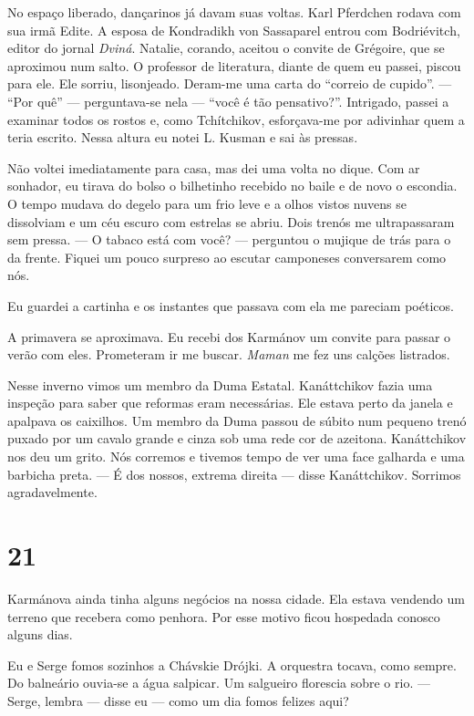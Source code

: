 No espaço liberado, dançarinos já davam suas voltas. Karl Pferdchen
rodava com sua irmã Edite. A esposa de Kondradikh von Sassaparel entrou
com Bodriévitch, editor do jornal \emph{Dviná}. Natalie, corando,
aceitou o convite de Grégoire, que se aproximou num salto. O professor
de literatura, diante de quem eu passei, piscou para ele. Ele sorriu,
lisonjeado. Deram-me uma carta do ``correio de cupido''. --- ``Por quê''
--- perguntava-se nela --- ``você é tão pensativo?''. Intrigado, passei
a examinar todos os rostos e, como Tchítchikov, esforçava-me por
adivinhar quem a teria escrito. Nessa altura eu notei L. Kusman e sai às
pressas.

Não voltei imediatamente para casa, mas dei uma volta no dique. Com ar
sonhador, eu tirava do bolso o bilhetinho recebido no baile e de novo o
escondia. O tempo mudava do degelo para um frio leve e a olhos vistos
nuvens se dissolviam e um céu escuro com estrelas se abriu. Dois trenós
me ultrapassaram sem pressa. --- O tabaco está com você? --- perguntou o
mujique de trás para o da frente. Fiquei um pouco surpreso ao escutar
camponeses conversarem como nós.

Eu guardei a cartinha e os instantes que passava com ela me pareciam
poéticos.

A primavera se aproximava. Eu recebi dos Karmánov um convite para passar
o verão com eles. Prometeram ir me buscar. \emph{Maman} me fez uns
calções listrados.

Nesse inverno vimos um membro da Duma Estatal. Kanáttchikov fazia uma
inspeção para saber que reformas eram necessárias. Ele estava perto da
janela e apalpava os caixilhos. Um membro da Duma passou de súbito num
pequeno trenó puxado por um cavalo grande e cinza sob uma rede cor de
azeitona. Kanáttchikov nos deu um grito. Nós corremos e tivemos tempo de
ver uma face galharda e uma barbicha preta. --- É dos nossos, extrema
direita --- disse Kanáttchikov. Sorrimos agradavelmente.

\section{21}

Karmánova ainda tinha alguns negócios na nossa cidade. Ela estava
vendendo um terreno que recebera como penhora. Por esse motivo ficou
hospedada conosco alguns dias.

Eu e Serge fomos sozinhos a Chávskie Drójki. A orquestra tocava, como
sempre. Do balneário ouvia-se a água salpicar. Um salgueiro florescia
sobre o rio. --- Serge, lembra --- disse eu --- como um dia fomos
felizes aqui?

